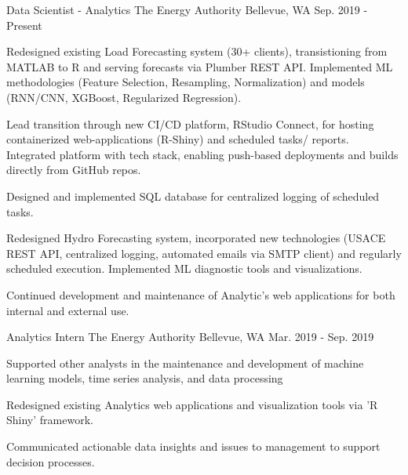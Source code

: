 

\begin{cventries}

  \cventry
    {Data Scientist - Analytics} %
    {The Energy Authority} %
    {Bellevue, WA} %
    {Sep. 2019 - Present} %
    {
      \begin{cvitems} %
        \item {Redesigned existing Load Forecasting system (30+ clients), transistioning from MATLAB to R and serving forecasts via Plumber REST API. Implemented ML methodologies (Feature Selection, Resampling, Normalization) and models (RNN/CNN, XGBoost, Regularized Regression).}
        \item {Lead transition through new CI/CD platform, RStudio Connect, for hosting containerized web-applications (R-Shiny) and scheduled tasks/ reports. Integrated platform with tech stack, enabling push-based deployments and builds directly from GitHub repos.}
        \item {Designed and implemented SQL database for centralized logging of scheduled tasks.}
        \item {Redesigned Hydro Forecasting system, incorporated new technologies (USACE REST API, centralized logging, automated emails via SMTP client) and regularly scheduled execution. Implemented ML diagnostic tools and visualizations.}
        \item {Continued development and maintenance of Analytic's web applications for both internal and external use.}
      \end{cvitems}
    }

  \cventry
    {Analytics Intern} %
    {The Energy Authority} %
    {Bellevue, WA} %
    {Mar. 2019 - Sep. 2019} %
    {
      \begin{cvitems} %
        \item {Supported other analysts in the maintenance and development of machine learning models, time series analysis, and data processing}
        \item {Redesigned existing Analytics web applications and visualization tools via 'R Shiny' framework.}
        \item {Communicated actionable data insights and issues to management to support decision processes.}
      \end{cvitems}
    }


\end{cventries}
